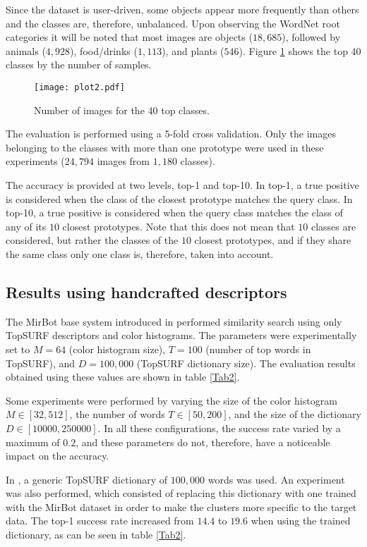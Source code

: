 \documentclass[final, twocolumn]{elsarticle}
\begin{document}
Since the dataset is user-driven, some objects appear more frequently than others and the classes are, therefore, unbalanced. Upon observing the WordNet root categories it will be noted that most images are objects ($18,685$), followed by animals ($4,928$), food/drinks ($1,113$), and plants ($546$). Figure \ref{Plot2} shows the top 40 classes by the number of samples. 

\begin{figure}[ht]
\center
\texttt{[image: plot2.pdf]}
\caption{\label{Plot2}Number of images for the 40 top classes. }
\end{figure}

The evaluation is performed using a 5-fold cross validation. Only the images belonging to the classes with more than one prototype were used in these experiments ($24,794$ images from $1,180$ classes). 

The accuracy is provided at two levels, top-1 and top-10. In top-1, a true positive is considered when the class of the closest prototype matches the query class. In top-10, a true positive is considered when the query class matches the class of any of its $10$ closest prototypes. Note that this does not mean that $10$ classes are considered, but rather the classes of the $10$ closest prototypes, and if they share the same class only one class is, therefore, taken into account.


\subsection{Results using handcrafted descriptors}

The MirBot base system introduced in \cite{MirBot:System} performed similarity search using only TopSURF descriptors and color histograms. The parameters were experimentally set to $M=64$ (color histogram size), $T=100$ (number of top words in TopSURF), and $D=100,000$ (TopSURF dictionary size). The evaluation results obtained using these values are shown in table \ref{Tab2}.

Some experiments were performed by varying the size of the color histogram $M \in [32,512]$, the number of words $T\in [50,200]$, and the size of the dictionary $D\in [10000, 250000]$. In all these configurations, the success rate varied by a maximum of $0.2$, and these parameters do not, therefore, have a noticeable impact on the accuracy.

In \cite{MirBot:System}, a generic TopSURF dictionary of $100,000$ words was used. An experiment was also performed, which consisted of replacing this dictionary with one trained with the MirBot dataset in order to make the clusters more specific to the target data. The top-1 success rate increased from $14.4$ to $19.6$ when using the trained dictionary, as can be seen in table \ref{Tab2}.
\end{document}
